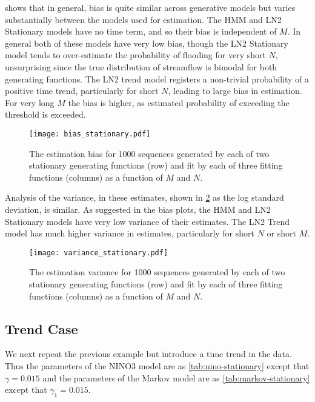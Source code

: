 \documentclass[12pt]{article}
\begin{document}
 shows that in general, bias is quite similar across generative models but varies substantially between the models used for estimation.
The HMM and LN2 Stationary models have no time term, and so their bias is independent of $M$.
In general both of these models have very low bias, though the LN2 Stationary model tends to over-estimate the probability of flooding for very short $N$, unsurprising since the true distribution of streamflow is bimodal for both generating functions. 
The LN2 trend model registers a non-trivial probability of a positive time trend, particularly for short $N$, leading to large bias in estimation.
For very long $M$ the bias is higher, as estimated probability of exceeding the threshold is exceeded.
\begin{figure}[ht]
  \texttt{[image: bias\_stationary.pdf]}
  \caption{The estimation bias for 1000 sequences generated by each of two stationary generating functions (row) and fit by each of three fitting functions (columns) as a function of $M$ and $N$.\label{fig:stationary-bias}}
\end{figure}

Analysis of the variance, in these estimates, shown in \cref{fig:stationary-variance} as the log standard deviation, is similar.
As suggested in the bias plots, the HMM and LN2 Stationary models have very low variance of their estimates.
The LN2 Trend model has much higher variance in estimates, particularly for short $N$ or short $M$.
\begin{figure}[ht]
  \texttt{[image: variance\_stationary.pdf]}
  \caption{The estimation variance for 1000 sequences generated by each of two stationary generating functions (row) and fit by each of three fitting functions (columns) as a function of $M$ and $N$.\label{fig:stationary-variance}}
\end{figure}

\subsection{Trend Case}

We next repeat the previous example but introduce a time trend in the data.
Thus the parameters of the NINO3 model are as \cref{tab:nino-stationary} except that $\gamma=0.015$ and the parameters of the Markov model are as \cref{tab:markov-stationary} except that $\gamma_1 = 0.015$.
\end{document}
